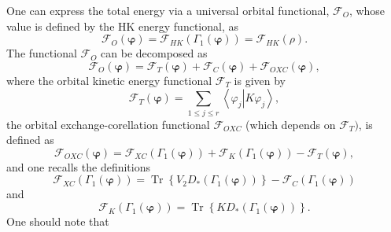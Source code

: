 \documentclass[aps,preprint]{revtex4}%
\begin{document}
One can express the total energy via a universal orbital functional,
$\mathcal{F}_{O}$, whose value is defined by the HK energy functional, as
\begin{equation}
\mathcal{F}_{O}\left(  \boldsymbol{\varphi}\right)  =\mathcal{F}_{HK}\left(
\Gamma_{1}\left(  \boldsymbol{\varphi}\right)  \right)  =\mathcal{F}%
_{HK}\left(  \rho\right)  . \label{FO}%
\end{equation}
The functional $\mathcal{F}_{O}$ can be decomposed as
\begin{equation}
\mathcal{F}_{O}\left(  \boldsymbol{\varphi}\right)  =\mathcal{F}_{T}\left(
\boldsymbol{\varphi}\right)  +\mathcal{F}_{C}\left(  \boldsymbol{\varphi
}\right)  +\mathcal{F}_{OXC}\left(  \boldsymbol{\varphi}\right)  , \label{KS1}%
\end{equation}
where the orbital kinetic energy functional $\mathcal{F}_{T}$ is given by
\begin{equation}
\mathcal{F}_{T}\left(  \boldsymbol{\varphi}\right)  =\sum_{1\leq j\leq
r}\left\langle \varphi_{j}\left\vert K\varphi_{j}\right.  \right\rangle ,
\end{equation}
the orbital exchange-corellation functional $\mathcal{F}_{OXC}$ (which depends
on $\mathcal{F}_{T}\boldsymbol{)}$, is defined as
\begin{equation}
\mathcal{F}_{OXC}\left(  \boldsymbol{\varphi}\right)  =\mathcal{F}_{XC}\left(
\Gamma_{1}\left(  \boldsymbol{\varphi}\right)  \right)  +\mathcal{F}%
_{K}\left(  \Gamma_{1}\left(  \boldsymbol{\varphi}\right)  \right)
-\mathcal{F}_{T}\left(  \boldsymbol{\varphi}\right)  , \label{KS2}%
\end{equation}
and one recalls the definitions
\begin{equation}
\mathcal{F}_{XC}\left(  \Gamma_{1}\left(  \boldsymbol{\varphi}\right)
\right)  =\operatorname{Tr}\left\{  V_{2}D_{\ast}\left(  \Gamma_{1}\left(
\boldsymbol{\varphi}\right)  \right)  \right\}  -\mathcal{F}_{C}\left(
\Gamma_{1}\left(  \boldsymbol{\varphi}\right)  \right)  \label{KS3}%
\end{equation}
and
\begin{equation}
\mathcal{F}_{K}\left(  \Gamma_{1}\left(  \boldsymbol{\varphi}\right)  \right)
=\operatorname{Tr}\left\{  KD_{\ast}\left(  \Gamma_{1}\left(
\boldsymbol{\varphi}\right)  \right)  \right\}  . \label{KS4}%
\end{equation}
One should note that
\end{document}
